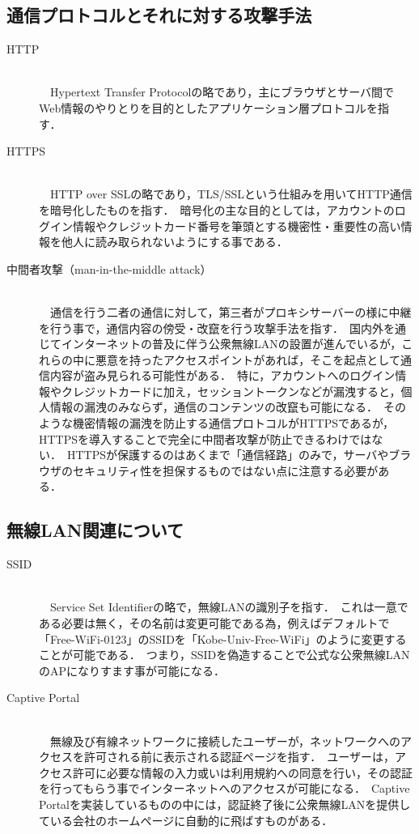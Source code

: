 \documentclass[dvipdfmx]{jsarticle}
\begin{document}
        \subsection{通信プロトコルとそれに対する攻撃手法}
            \begin{description}
                \item[HTTP]\mbox{}\\
                    　Hypertext Transfer Protocolの略であり，主にブラウザとサーバ間でWeb情報のやりとりを目的としたアプリケーション層プロトコルを指す．\
                \item[HTTPS]\mbox{}\\ 
                    　HTTP over SSLの略であり，TLS/SSLという仕組みを用いてHTTP通信を暗号化したものを指す．\
                    暗号化の主な目的としては，アカウントのログイン情報やクレジットカード番号を筆頭とする機密性・重要性の高い情報を他人に読み取られないようにする事である．\
                \item[中間者攻撃（man-in-the-middle attack）]\mbox{}\\ 
                    　通信を行う二者の通信に対して，第三者がプロキシサーバーの様に中継を行う事で，通信内容の傍受・改竄を行う攻撃手法を指す．\
                    国内外を通じてインターネットの普及に伴う公衆無線LANの設置が進んでいるが，これらの中に悪意を持ったアクセスポイントがあれば，そこを起点として通信内容が盗み見られる可能性がある．\
                    特に，アカウントへのログイン情報やクレジットカードに加え，セッショントークンなどが漏洩すると，個人情報の漏洩のみならず，通信のコンテンツの改竄も可能になる．\
                    そのような機密情報の漏洩を防止する通信プロトコルがHTTPSであるが，HTTPSを導入することで完全に中間者攻撃が防止できるわけではない．\
                    HTTPSが保護するのはあくまで「通信経路」のみで，サーバやブラウザのセキュリティ性を担保するものではない点に注意する必要がある\cite{AboutMITM}．\
            \end{description}
        \subsection{無線LAN関連について}
            \begin{description}
                \item [SSID]\mbox{}\\
                    　Service Set Identifierの略で，無線LANの識別子を指す．\
                    これは一意である必要は無く，その名前は変更可能である為，例えばデフォルトで「Free-WiFi-0123」のSSIDを「Kobe-Univ-Free-WiFi」のように変更することが可能である．\
                    つまり，SSIDを偽造することで公式な公衆無線LANのAPになりすます事が可能になる．\
                \item [Captive Portal]\mbox{}\\
                    　無線及び有線ネットワークに接続したユーザーが，ネットワークへのアクセスを許可される前に表示される認証ページを指す．\
                    ユーザーは，アクセス許可に必要な情報の入力或いは利用規約への同意を行い，その認証を行ってもらう事でインターネットへのアクセスが可能になる．\
                    Captive Portalを実装しているものの中には，認証終了後に公衆無線LANを提供している会社のホームページに自動的に飛ばすものがある．\
            \end{description}
\end{document}
